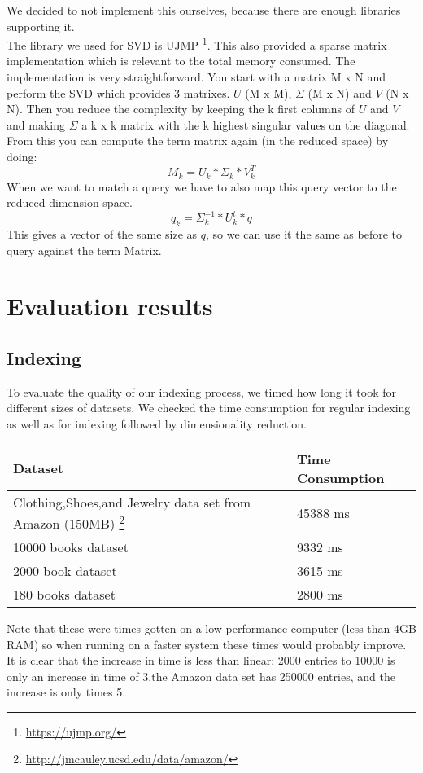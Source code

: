 \documentclass[10pt,a4paper]{paper}
\begin{document}
We decided to not implement this ourselves, because there are enough libraries supporting it.\\
The library we used for SVD is UJMP \footnote{\url{https://ujmp.org/}}. This also provided a sparse matrix implementation which is relevant to the total memory consumed. The implementation is very straightforward. You start with a matrix M x N and perform the SVD which provides 3 matrixes. $U$ (M x M), $\Sigma$ (M x N) and $V$ (N x N). Then you reduce the complexity by keeping the k first columns of $U$ and $V$ and making $\Sigma$ a k x k matrix with the k highest singular values on the diagonal. From this you can compute the term matrix again (in the reduced space) by doing:
\[
M_k = U_k * \Sigma_k * V_k^T
\]
When we want to match a query we have to also map this query vector to the reduced dimension space.
\[
q_k = \Sigma_k^{-1} * U_k^t * q
\]
This gives a vector of the same size as $q$, so we can use it the same as before to query against the term Matrix.

\section{Evaluation results}

\subsection{Indexing}

To evaluate the quality of our indexing process, we timed how long it took for different sizes of datasets. We checked the time consumption for regular indexing as well as for indexing followed by dimensionality reduction. 

\begin{tabular} {l|l}
Dataset & Time Consumption \\ \hline
Clothing,Shoes,and Jewelry data set from Amazon (150MB) \footnote{\url{http://jmcauley.ucsd.edu/data/amazon/}} &  45388 ms \\ \hline
10000 books dataset & 9332 ms \\ \hline
2000 book dataset & 3615 ms \\ \hline
180 books dataset & 2800 ms \\ \hline

\end{tabular}
Note that these were times gotten on a low performance computer (less than 4GB RAM) so when running on a faster system these times would probably improve.
It is clear that the increase in time is less than linear: 2000 entries to 10000 is only an increase in time of 3.the Amazon data set has 250000 entries, and the increase is only times 5.
\end{document}
